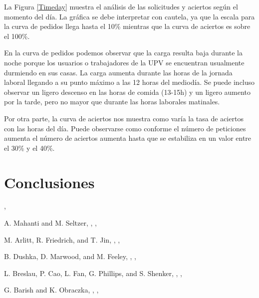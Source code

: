 \documentclass[twocolumn]{Jornadas}
\begin{document}
La Figura \ref{Timeday} muestra el análisis de las solicitudes y aciertos según el momento del día. La gráfica se debe interpretar con cautela, ya que la escala para la curva de pedidos llega hasta el 10\% mientras que la curva de aciertos es sobre el 100\%. 

En la curva de pedidos podemos observar que la carga resulta baja durante la noche porque los usuarios o trabajadores de la UPV se encuentran usualmente durmiendo en sus casas. La carga aumenta durante las horas de la jornada laboral llegando a su punto máximo a las 12 horas del mediodía. Se puede incluso observar un ligero descenso en las horas de comida (13-15h) y un ligero aumento por la tarde, pero no mayor que durante las horas laborales matinales.

Por otra parte, la curva de aciertos nos muestra como varía la tasa de aciertos con las horas del día. Puede observarse como conforme el número de peticiones aumenta el número de aciertos aumenta hasta que se estabiliza en un valor entre el 30\% y el 40\%.




\section{Conclusiones}
\label{conclusiones}



\nocite{*}


\begin{thebibliography}{1}


,

A. Mahanti and M. Seltzer,
,
,

M. Arlitt, R. Friedrich, and T. Jin,
,
,

B. Dushka, D. Marwood, and M. Feeley,
,
,

L. Breslau, P. Cao, L. Fan, G. Phillips, and S. Shenker,
,
,

G. Barish and K. Obraczka,
,
,

\end{thebibliography}
\end{document}
